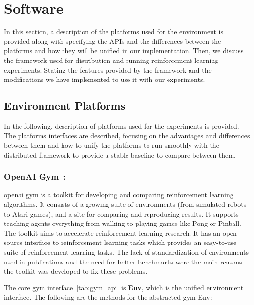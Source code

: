 \section{Software}
In this section, a description of the platforms used for the environment is provided along with specifying the APIs and the differences between the platforms and how they will be unified in our implementation. Then, we discuss the framework used for distribution and running reinforcement learning experiments. Stating the features provided by the framework and the modifications we have implemented to use it with our experiments. 

\subsection{Environment Platforms}

In the following, description of platforms used for the experiments is provided. The platforms interfaces are described, focusing on the advantages and differences between them and how to unify the platforms to run smoothly with the distributed framework to provide a stable baseline to compare between them.

\subsubsection{OpenAI Gym~\parencite{brockman2016openai}: } openai gym is a toolkit for developing and comparing reinforcement learning algorithms. It consists of a growing suite of environments (from simulated robots to Atari games), and a site for comparing and reproducing results. It supports teaching agents everything from walking to playing games like Pong or Pinball. The toolkit aims to accelerate reinforcement learning research. It has an open-source interface to reinforcement learning tasks which provides an easy-to-use suite of reinforcement learning tasks. The lack of standardization of environments used in publications and the need for better benchmarks were the main reasons the toolkit was developed to fix these problems.

The core gym interface~\ref{tab:gym_api} is \textbf{Env}, which is the unified environment interface. 
The following are the methods for the abstracted gym Env:

